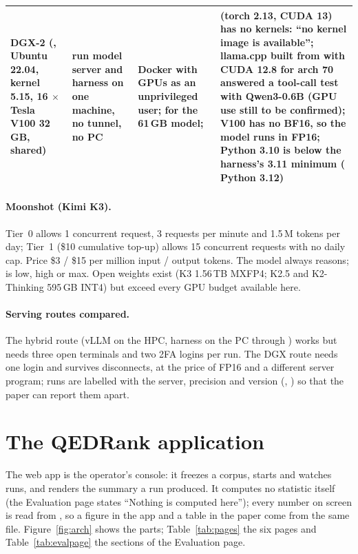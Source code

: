 \documentclass[11pt,a4paper]{article}
\begin{document}
\begin{table}[htbp]
\begin{tabular}{L{28mm}L{26mm}L{38mm}L{56mm}}
DGX-2 (, Ubuntu 22.04, kernel 5.15, 16 $\times$ Tesla V100 32\,GB, shared) & run model server and harness on one machine, no tunnel, no PC & Docker with GPUs as an unprivileged user;  for the 61\,GB model;  &  (torch 2.13, CUDA 13) has no  kernels: ``no kernel image is available''; llama.cpp \cite{llamacpp} built from  with CUDA 12.8 for arch 70 answered a tool-call test with Qwen3-0.6B (GPU use still to be confirmed); V100 has no BF16, so the model runs in FP16; Python 3.10 is below the harness's 3.11 minimum ( Python 3.12) \\
\bottomrule
\end{tabular}
\end{table}

\paragraph{Moonshot (Kimi K3).} Tier~0 allows 1 concurrent request, 3 requests per minute and 1.5\,M tokens per day; Tier~1 (\$10 cumulative top-up) allows 15 concurrent requests with no daily cap. Price \$3 / \$15 per million input / output tokens. The model always reasons;  is low, high or max. Open weights exist (K3 1.56\,TB MXFP4; K2.5 and K2-Thinking 595\,GB INT4) but exceed every GPU budget available here.

\paragraph{Serving routes compared.} The hybrid route (vLLM on the HPC, harness on the PC through ) works but needs three open terminals and two 2FA logins per run. The DGX route needs one login and survives disconnects, at the price of FP16 and a different server program; runs are labelled with the server, precision and version (, ) so that the paper can report them apart.

\section{The QEDRank application}
\label{sec:app}

The web app is the operator's console: it freezes a corpus, starts and watches runs, and renders the summary a run produced. It computes no statistic itself (the Evaluation page states ``Nothing is computed here''); every number on screen is read from , so a figure in the app and a table in the paper come from the same file. Figure~\ref{fig:arch} shows the parts; Table~\ref{tab:pages} the six pages and Table~\ref{tab:evalpage} the sections of the Evaluation page.
\end{document}
